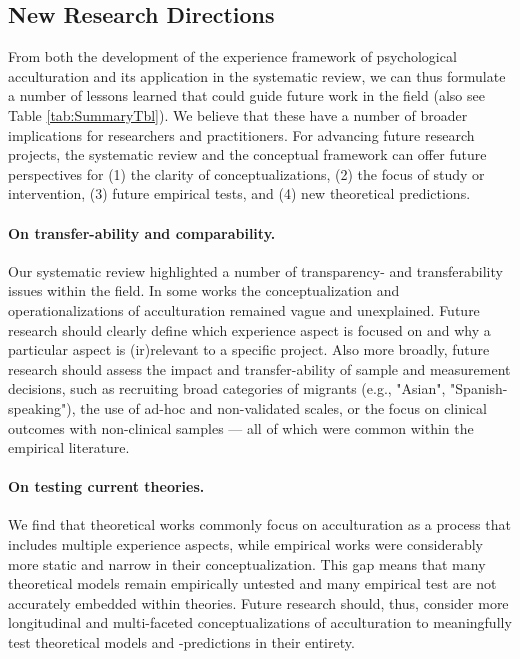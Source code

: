 \documentclass[man, 12pt, a4paper, mask]{apa7}
\begin{document}
\subsection{New Research Directions}
From both the development of the experience framework of psychological acculturation and its application in the systematic review, we can thus formulate a number of lessons learned that could guide future work in the field (also see Table \ref{tab:SummaryTbl}). We believe that these have a number of broader implications for researchers and practitioners.
For advancing future research projects, the systematic review and the conceptual framework can offer future perspectives for (1) the clarity of conceptualizations, (2) the focus of study or intervention, (3) future empirical tests, and (4) new theoretical predictions. 

\paragraph{On transfer-ability and comparability.} Our systematic review highlighted a number of transparency- and transferability issues within the field. In some works the conceptualization and operationalizations of acculturation remained vague and unexplained. Future research should clearly define which experience aspect is focused on and why a particular aspect is (ir)relevant to a specific project. Also more broadly, future research should assess the impact and transfer-ability of sample and measurement decisions, such as recruiting broad categories of migrants (e.g., "Asian", "Spanish-speaking"), the use of ad-hoc and non-validated scales, or the focus on clinical outcomes with non-clinical samples --- all of which were common within the empirical literature.


\paragraph{On testing current theories.} We find that theoretical works commonly focus on acculturation as a process that includes multiple experience aspects, while empirical works were considerably more static and narrow in their conceptualization. This gap means that many theoretical models remain empirically untested and many empirical test are not accurately embedded within theories. Future research should, thus, consider more longitudinal and multi-faceted conceptualizations of acculturation to meaningfully test theoretical models and -predictions in their entirety.
\end{document}
